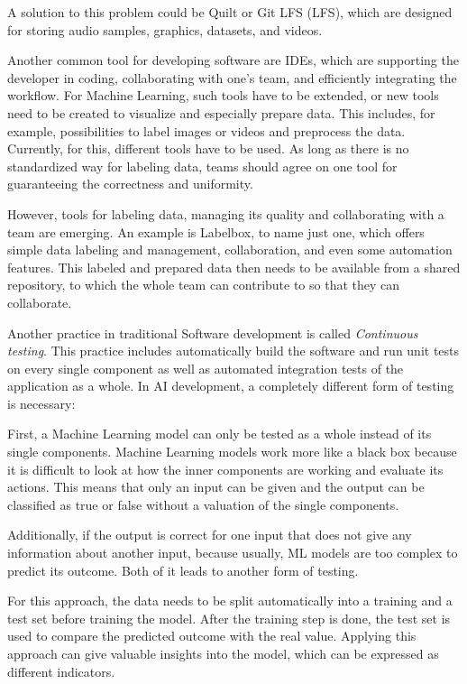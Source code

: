 \documentclass[12pt,english,a4paper,oneside,,tablecaptionabove]{scrbook}
\begin{document}
A solution to this problem could be Quilt or Git \acl{LFS} (\acs{LFS}),
which are designed for storing audio samples, graphics, datasets, and
videos.

Another common tool for developing software are IDEs, which are
supporting the developer in coding, collaborating with one's team, and
efficiently integrating the workflow. For Machine Learning, such tools
have to be extended, or new tools need to be created to visualize and
especially prepare data. This includes, for example, possibilities to
label images or videos and preprocess the data. Currently, for this,
different tools have to be used. As long as there is no standardized way
for labeling data, teams should agree on one tool for guaranteeing the
correctness and uniformity.

However, tools for labeling data, managing its quality and collaborating
with a team are emerging. An example is Labelbox, to name just one,
which offers simple data labeling and management, collaboration, and
even some automation features. This labeled and prepared data then needs
to be available from a shared repository, to which the whole team can
contribute to so that they can collaborate.

Another practice in traditional Software development is called
\emph{Continuous testing}. This practice includes automatically build
the software and run unit tests on every single component as well as
automated integration tests of the application as a whole. In AI
development, a completely different form of testing is necessary:

First, a Machine Learning model can only be tested as a whole instead of
its single components. Machine Learning models work more like a black
box because it is difficult to look at how the inner components are
working and evaluate its actions. This means that only an input can be
given and the output can be classified as true or false without a
valuation of the single components.

Additionally, if the output is correct for one input that does not give
any information about another input, because usually, ML models are too
complex to predict its outcome. Both of it leads to another form of
testing.

For this approach, the data needs to be split automatically into a
training and a test set before training the model. After the training
step is done, the test set is used to compare the predicted outcome with
the real value. Applying this approach can give valuable insights into
the model, which can be expressed as different indicators.
\end{document}
